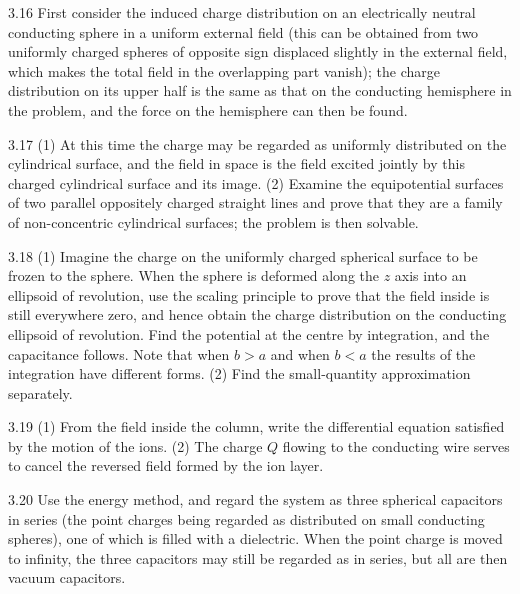 \begin{hint}{3.16}
First consider the induced charge distribution on an electrically neutral conducting sphere in a uniform external field (this can be obtained from two uniformly charged spheres of opposite sign displaced slightly in the external field, which makes the total field in the overlapping part vanish); the charge distribution on its upper half is the same as that on the conducting hemisphere in the problem, and the force on the hemisphere can then be found.
\end{hint}

\begin{hint}{3.17}
(1) At this time the charge may be regarded as uniformly distributed on the cylindrical surface, and the field in space is the field excited jointly by this charged cylindrical surface and its image. (2) Examine the equipotential surfaces of two parallel oppositely charged straight lines and prove that they are a family of non-concentric cylindrical surfaces; the problem is then solvable.
\end{hint}

\begin{hint}{3.18}
(1) Imagine the charge on the uniformly charged spherical surface to be frozen to the sphere. When the sphere is deformed along the $z$ axis into an ellipsoid of revolution, use the scaling principle to prove that the field inside is still everywhere zero, and hence obtain the charge distribution on the conducting ellipsoid of revolution. Find the potential at the centre by integration, and the capacitance follows. Note that when $b>a$ and when $b<a$ the results of the integration have different forms. (2) Find the small-quantity approximation separately.
\end{hint}

\begin{hint}{3.19}
(1) From the field inside the column, write the differential equation satisfied by the motion of the ions. (2) The charge $Q$ flowing to the conducting wire serves to cancel the reversed field formed by the ion layer.
\end{hint}

\begin{hint}{3.20}
Use the energy method, and regard the system as three spherical capacitors in series (the point charges being regarded as distributed on small conducting spheres), one of which is filled with a dielectric. When the point charge is moved to infinity, the three capacitors may still be regarded as in series, but all are then vacuum capacitors.
\end{hint}

